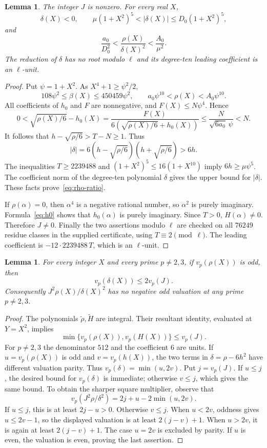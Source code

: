 \documentclass[11pt]{article}
\newtheorem{lemma}[theorem]{Lemma}
\theoremstyle{remark}\newtheorem{remark}[theorem]{Remark}
\begin{document}
\begin{lemma}\label{lem:denominator}
The integer $J$ is nonzero.  For every real $X$,
\[
 \delta(X)<0,\qquad
 \mu(1+X^2)^5<|\delta(X)|\le D_0(1+X^2)^5,
\]
and
\begin{equation}\label{eq:rho-ratio}
 \frac{a_0}{D_0^2}
 <\frac{\rho(X)}{\delta(X)^2}<\frac{A_0}{\mu^2}.
\end{equation}
The reduction of $\delta$ has no root modulo $\ell$ and its
degree-ten leading coefficient is an $\ell$-unit.
\end{lemma}
\begin{proof}
Put $\psi=1+X^2$.  As $X^4+1\ge\psi^2/2$,
\[
 108\psi^2\le\beta(X)\le450459\psi^2,
 \qquad a_0\psi^{10}<\rho(X)<A_0\psi^{10}.
\]
All coefficients of $h_0$ and $F$ are nonnegative, and
$F(X)\le N\psi^4$.  Hence
\[
 0<\sqrt{\rho(X)/6}-h_0(X)
 =\frac{F(X)}{6(\sqrt{\rho(X)/6}+h_0(X))}
 \le\frac{N}{\sqrt{6a_0}\,\psi}<N.
\]
It follows that $h-\sqrt{\rho/6}>T-N\ge1$.  Thus
\[
 |\delta|=6(h-\sqrt{\rho/6})(h+\sqrt{\rho/6})>6h.
\]
The inequalities $T\ge2239488$ and
$(1+X^2)^5\le16(1+X^{10})$ imply $6h\ge\mu\psi^5$.
The coefficient norm of the degree-ten polynomial $\delta$ gives
the upper bound for $|\delta|$.  These facts prove~\eqref{eq:rho-ratio}.

If $\rho(\alpha)=0$, then $\alpha^4$ is a negative rational
number, so $\alpha^2$ is purely imaginary.  Formula~\eqref{eq:h0}
shows that $h_0(\alpha)$ is purely imaginary.  Since $T>0$,
$H(\alpha)\ne0$.  Therefore $J\ne0$.
Finally the two assertions modulo $\ell$ are checked on all
$76249$ residue classes in the supplied certificate, using
$T\equiv2\pmod\ell$.  The leading coefficient is
$-12\cdot2239488\,T$, which is an $\ell$-unit.
\end{proof}

\begin{lemma}\label{lem:odd-valuations}
For every integer $X$ and every prime $p\ne2,3$, if
$v_p(\rho(X))$ is odd, then
\[
                    v_p(\delta(X))\le2v_p(J).
\]
Consequently $J^2\rho(X)/\delta(X)^2$ has no negative odd
valuation at any prime $p\ne2,3$.
\end{lemma}
\begin{proof}
The polynomials $\widetilde\rho,\widetilde H$ are integral.
Their resultant identity, evaluated at $Y=X^2$, implies
\[
 \min\{v_p(\rho(X)),v_p(H(X))\}\le v_p(J).
\]
For $p\ne2,3$ the denominator $512$ and the coefficient $6$ are
units.  If $u=v_p(\rho(X))$ is odd and $v=v_p(h(X))$, the two
terms in $\delta=\rho-6h^2$ have different valuation parity.
Thus $v_p(\delta)=\min(u,2v)$.
Put $j=v_p(J)$.  If $u\le j$, the desired bound for
$v_p(\delta)$ is immediate; otherwise $v\le j$, which gives the
same bound.  To obtain the sharper square multiplier, observe that
\[
 v_p(J^2\rho/\delta^2)=2j+u-2\min(u,2v).
\]
If $u\le j$, this is at least $2j-u>0$.  Otherwise $v\le j$.
When $u<2v$, oddness gives $u\le2v-1$, so the displayed valuation
is at least $2(j-v)+1$.  When $u>2v$, it is again at least
$2(j-v)+1$.  The case $u=2v$ is excluded by parity.
If $u$ is even, the valuation is even, proving the last assertion.
\end{proof}
\end{document}
